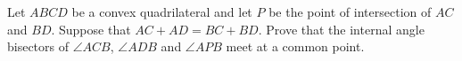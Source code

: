Let $ABCD$ be a convex quadrilateral and let $P$ be the point of intersection of $AC$ and $BD$. Suppose that $AC+AD=BC+BD$. Prove that the internal angle bisectors of $\angle ACB$,  $\angle ADB$ and $\angle APB$ meet at a common point.